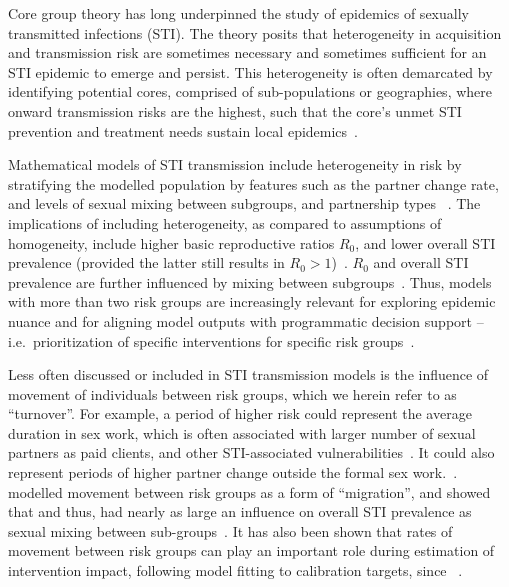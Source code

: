 Core group theory has long underpinned the study of
epidemics of sexually transmitted infections (STI).
The theory posits that heterogeneity in
acquisition and transmission risk are sometimes necessary and sometimes sufficient for
an STI epidemic to emerge and persist.
This heterogeneity is often demarcated by identifying potential cores,
comprised of sub-populations or geographies,
where onward transmission risks are the highest,
such that the core's unmet STI prevention and treatment needs
sustain local epidemics~\citep{Yorke1978,Gesink2011}.
\par
Mathematical models of STI transmission include heterogeneity in risk
by stratifying the modelled population by features such as
the partner change rate, and levels of sexual mixing between subgroups, and partnership types%
~\cite{}. %
The implications of including heterogeneity,
as compared to assumptions of homogeneity, include
higher basic reproductive ratios $R_0$, and
lower overall STI prevalence
(provided the latter still results in $R_0 > 1$)~\citep{Boily1997}.
$R_0$ and overall STI prevalence are further influenced by
mixing between subgroups~\citep{Boily1997}.
Thus, models with more than two risk groups
are increasingly relevant for exploring epidemic nuance
and for aligning model outputs with programmatic decision support
-- i.e.\ prioritization of specific interventions for specific risk groups~\cite{}. %
\par
Less often discussed or included in STI transmission models
is the influence of movement of individuals between risk groups,
which we herein refer to as ``turnover''.
For example, a period of higher risk could represent
the average duration in sex work,
which is often associated with larger number of sexual partners as paid clients,
and other STI-associated vulnerabilities~\cite{}. %
It could also represent periods of higher partner change
outside the formal sex work.~\cite{}. %
\citeauthor{Stigum1994} modelled movement between risk groups as a form of ``migration'',
and showed that %
and thus, had nearly as large an influence on overall STI prevalence
as sexual mixing between sub-groups~\citep{Stigum1994}.
It has also been shown that rates of movement between risk groups
can play an important role during estimation of intervention impact,
following model fitting to calibration targets,
since %
~\citep{Eaton2014}.
\par
